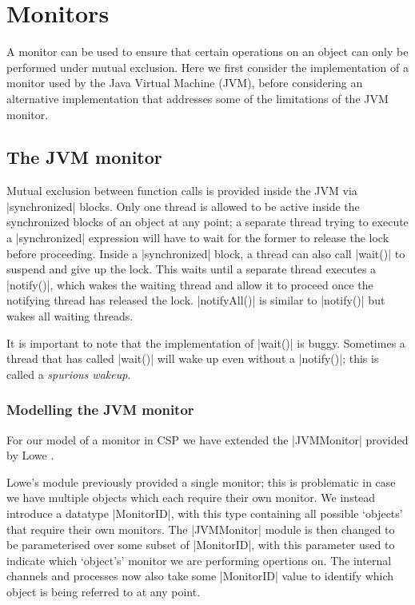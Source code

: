 \inlineCSP
\section{Monitors}

A monitor can be used to ensure that certain operations on an object can only be performed under mutual exclusion. Here we first consider the implementation of a monitor used by the Java Virtual Machine (JVM), before considering an alternative implementation that addresses some of the limitations of the JVM monitor.

\subsection{The JVM monitor}

Mutual exclusion between function calls is provided inside the JVM via |synchronized| blocks. Only one thread is allowed to be active inside the synchronized blocks of an object at any point; a separate thread trying to execute a |synchronized| expression will have to wait for the former to release the lock before proceeding. Inside a |synchronized| block, a thread can also call |wait()| to suspend and give up the lock. This waits until a separate thread executes a |notify()|, which wakes the waiting thread and allow it to proceed once the notifying thread has released the lock. |notifyAll()| is similar to |notify()| but wakes all waiting threads.

It is important to note that the implementation of |wait()| is buggy. Sometimes a thread that has called |wait()| will wake up even without a |notify()|; this is called a \emph{spurious wakeup}.




\subsubsection{Modelling the JVM monitor}\label{section:JVMMonitor}

\inlineCSP

For our model of a monitor in CSP we have extended the |JVMMonitor| provided by Lowe \cite{LoweJVMMonitor}.

Lowe's module previously provided a single monitor; this is problematic in case we have multiple objects which each require their own monitor. We instead introduce a datatype |MonitorID|, with this type containing all possible `objects' that require their own monitors. The |JVMMonitor| module is then changed to be parameterised over some subset of |MonitorID|, with this parameter used to indicate which `object's' monitor we are performing opertions on. The internal channels and processes now also take some |MonitorID| value to identify which object is being referred to at any point.

